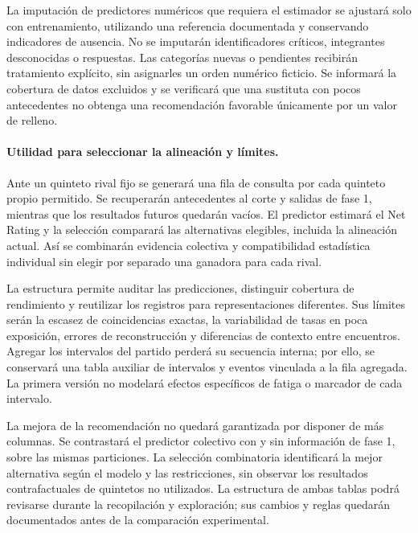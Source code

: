 La imputación de predictores numéricos que requiera el estimador se ajustará solo con entrenamiento, utilizando una referencia documentada y conservando indicadores de ausencia. No se imputarán identificadores críticos, integrantes desconocidas o respuestas. Las categorías nuevas o pendientes recibirán tratamiento explícito, sin asignarles un orden numérico ficticio. Se informará la cobertura de datos excluidos y se verificará que una sustituta con pocos antecedentes no obtenga una recomendación favorable únicamente por un valor de relleno.

\paragraph*{Utilidad para seleccionar la alineación y límites.}
Ante un quinteto rival fijo se generará una fila de consulta por cada quinteto propio permitido. Se recuperarán antecedentes al corte y salidas de fase 1, mientras que los resultados futuros quedarán vacíos. El predictor estimará el Net Rating y la selección comparará las alternativas elegibles, incluida la alineación actual. Así se combinarán evidencia colectiva y compatibilidad estadística individual sin elegir por separado una ganadora para cada rival.

La estructura permite auditar las predicciones, distinguir cobertura de rendimiento y reutilizar los registros para representaciones diferentes. Sus límites serán la escasez de coincidencias exactas, la variabilidad de tasas en poca exposición, errores de reconstrucción y diferencias de contexto entre encuentros. Agregar los intervalos del partido perderá su secuencia interna; por ello, se conservará una tabla auxiliar de intervalos y eventos vinculada a la fila agregada. La primera versión no modelará efectos específicos de fatiga o marcador de cada intervalo.

La mejora de la recomendación no quedará garantizada por disponer de más columnas. Se contrastará el predictor colectivo con y sin información de fase 1, sobre las mismas particiones. La selección combinatoria identificará la mejor alternativa según el modelo y las restricciones, sin observar los resultados contrafactuales de quintetos no utilizados. La estructura de ambas tablas podrá revisarse durante la recopilación y exploración; sus cambios y reglas quedarán documentados antes de la comparación experimental.
